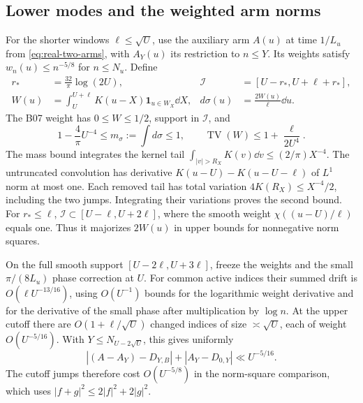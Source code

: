 \subsection{Lower modes and the weighted arm norms}
For the shorter windows \(\ell\le\sqrt U\), use the auxiliary arm
\(A(u)\) at time \(1/L_u\) from \eqref{eq:real-two-arms}, with
\(A_Y(u)\) its restriction to \(n\le Y\). Its weights satisfy
\(w_n(u)\le n^{-5/8}\) for \(n\le N_u\). Define
\begin{align*}
 r_*&=\frac{32}{\pi}\log(2U),&
 \mathcal I&=[U-r_*,U+\ell+r_*],\\
 W(u)&=\int_U^{U+\ell}K(u-X)\mathbf1_{u\in W_X}\dd X,&
 d\sigma(u)&=\frac{2W(u)}{\ell}\dd u .
\end{align*}
The B07 weight \cite{GNPRSLocalizedArm} has \(0\le W\le1/2\),
support in \(\mathcal I\), and
\begin{equation}\label{eq:b10-weight}
  1-\frac4\pi U^{-4}\le m_\sigma:=\int d\sigma\le1,\qquad
  \operatorname{TV}(W)\le1+\frac{\ell}{2U^4}.
\end{equation}
The mass bound integrates the kernel tail
\(\int_{|v|>R_X}K(v)\dd v\le (2/\pi)X^{-4}\).
The untruncated convolution has derivative
\(K(u-U)-K(u-U-\ell)\) of \(L^1\) norm at most one.
Each removed tail has total variation \(4K(R_X)\le X^{-4}/2\),
including the two jumps. Integrating their variations proves the
second bound. For \(r_*\le\ell\), \(\mathcal I\subset[U-\ell,U+2\ell]\),
where the smooth weight \(\chi((u-U)/\ell)\) equals one. Thus it
majorizes \(2W(u)\) in upper bounds for nonnegative norm squares.

On the full smooth support \([U-2\ell,U+3\ell]\), freeze the
weights and the small \(\pi/(8L_u)\) phase correction at \(U\).
For common active indices their summed drift is
\(O(\ell U^{-13/16})\), using \(O(U^{-1})\) bounds for the
logarithmic weight derivative and for the derivative of the
small phase after multiplication by \(\log n\). At the upper
cutoff there are \(O(1+\ell/\sqrt U)\) changed indices of size
\(\asymp\sqrt U\), each of weight \(O(U^{-5/16})\).
With \(Y\le N_{U-2\sqrt U}\), this gives uniformly
\[
 |(A-A_Y)-D_{Y,B}|+|A_Y-D_{0,Y}|\ll U^{-5/16}.
\]
The cutoff jumps therefore cost \(O(U^{-5/8})\) in the norm-square
comparison, which uses \(|f+g|^2\le2|f|^2+2|g|^2\).


